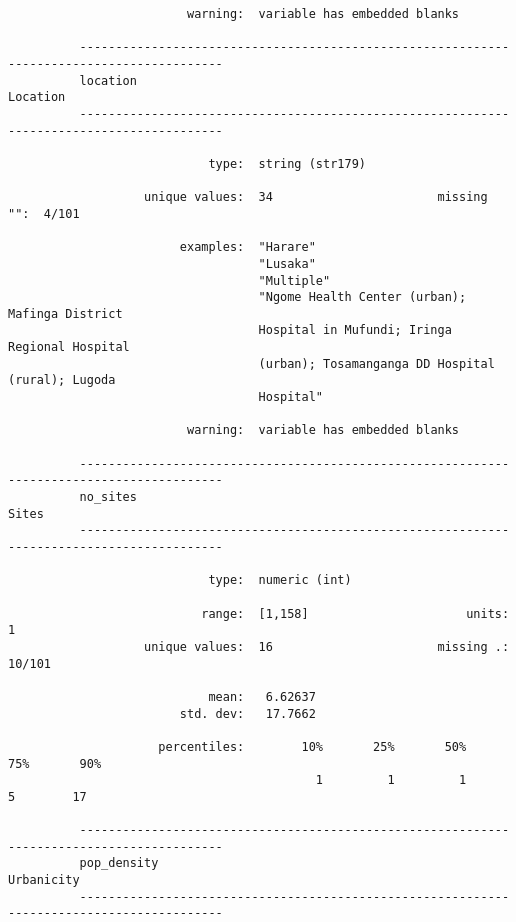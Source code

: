 \documentclass{article}
\begin{document}
\begin{verbatim}
                         warning:  variable has embedded blanks
          
          ------------------------------------------------------------------------------------------
          location                                                                          Location
          ------------------------------------------------------------------------------------------
          
                            type:  string (str179)
          
                   unique values:  34                       missing "":  4/101
          
                        examples:  "Harare"
                                   "Lusaka"
                                   "Multiple"
                                   "Ngome Health Center (urban); Mafinga District
                                   Hospital in Mufundi; Iringa Regional Hospital
                                   (urban); Tosamanganga DD Hospital (rural); Lugoda
                                   Hospital"
          
                         warning:  variable has embedded blanks
          
          ------------------------------------------------------------------------------------------
          no_sites                                                                             Sites
          ------------------------------------------------------------------------------------------
          
                            type:  numeric (int)
          
                           range:  [1,158]                      units:  1
                   unique values:  16                       missing .:  10/101
          
                            mean:   6.62637
                        std. dev:   17.7662
          
                     percentiles:        10%       25%       50%       75%       90%
                                           1         1         1         5        17
          
          ------------------------------------------------------------------------------------------
          pop_density                                                                     Urbanicity
          ------------------------------------------------------------------------------------------
          

\end{verbatim}
\end{document}
